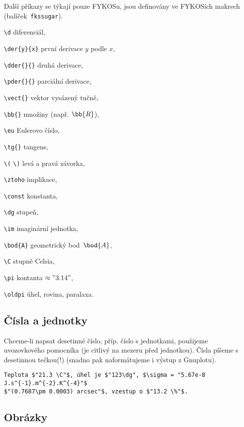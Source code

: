 \documentclass[fykos]{fksbase} %
\begin{document}
\newpage
Další příkazy se týkají pouze FYKOSu, jsou definovány ve FYKOSích makrech
(balíček~\verb|fkssugar|).\nopagebreak
\begin{multicols}{2}
\begin{compactitem}
    \item \verb|\d| diferenciál,
    \item \verb|\der{y}{x}| první derivace $y$ podle $x$,
    \item \verb|\dder{}{}| druhá derivace,
    \item \verb|\pder{}{}| parciální derivace,
    \item \verb|\vect{}| vektor vysázený tučně,
    \item \verb|\bb{}| množiny (např. $\bb{R}$),
    \item \verb|\eu| Eulerovo číslo,
    \item \verb|\tg{}| tangens,
    \item \verb|\(| \verb|\)| levá a pravá závorka,
    \item \verb|\ztoho| implikace,
    \item \verb|\const| konstanta,
    \item \verb|\dg| stupeň,
    \item \verb|\im| imaginární jednotka,
    \item \verb|\bod{A}| geometrický bod~$\bod{A}$,
    \item \verb|\C| stupně Celsia,
    \item \verb|\pi| kontanta $\approx "3.14"$,
    \item \verb|\oldpi| úhel, rovina, paralaxa.
\end{compactitem}
\end{multicols}

\subsection{Čísla a jednotky}

Chceme-li napsat desetinné číslo, příp. číslo s jednotkami, použijeme uvozovkového
pomocníka (je citlivý na mezeru před jednotkou). Čísla píšeme s desetinnou
tečkou(!) (snadno pak naformátujeme i výstup z Gnuplotu).

\begin{verbatim}
Teplota $"21.3 \C"$, úhel je $"123\dg", $\sigma = "5.67e-8 J.s^{-1}.m^{-2}.K^{-4}"$
$"(0.7687\pm 0.0003) arcsec"$, vzestup o $"13.2 \%"$.
\end{verbatim}


\subsection{Obrázky}
\end{document}
